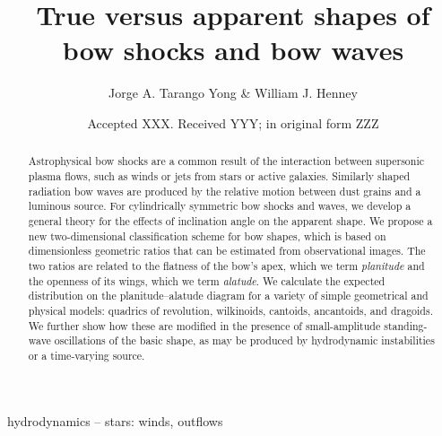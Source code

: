 \documentclass[useAMS, usenatbib, a4paper]{mnras}
\title[Bow shock shapes]{True versus apparent shapes of bow shocks and bow waves}
\author[Tarango Yong \& Henney]{
  Jorge A. Tarango Yong \& William J. Henney\\
  \AddressCRyA
}
\date{Accepted XXX. Received YYY; in original form ZZZ}
\begin{document}
\label{firstpage}
\pagerange{\pageref{firstpage}--\pageref{lastpage}}
\maketitle
\begin{abstract}
  Astrophysical bow shocks are a common result of the interaction
  between supersonic plasma flows, such as winds or jets from stars or
  active galaxies.  Similarly shaped radiation bow waves are produced
  by the relative motion between dust grains and a luminous source.
  For cylindrically symmetric bow shocks and waves, we develop a
  general theory for the effects of inclination angle on the apparent
  shape. We propose a new two-dimensional classification scheme for
  bow shapes, which is based on dimensionless geometric ratios that
  can be estimated from observational images.  The two ratios are
  related to the flatness of the bow's apex, which we term
  \textit{planitude} and the openness of its wings, which we term
  \textit{alatude}.  We calculate the expected distribution on the
  planitude--alatude diagram for a variety of simple geometrical and
  physical models: quadrics of revolution, wilkinoids, cantoids,
  ancantoids, and dragoids.  We further show how these are modified in
  the presence of small-amplitude standing-wave oscillations of the
  basic shape, as may be produced by hydrodynamic instabilities or a
  time-varying source.
\end{abstract}

\begin{keywords}
  hydrodynamics -- stars: winds, outflows
\end{keywords}


% 



\clearpage

\clearpage


\clearpage


\appendix





\bsp	%
\label{lastpage}
\end{document}
